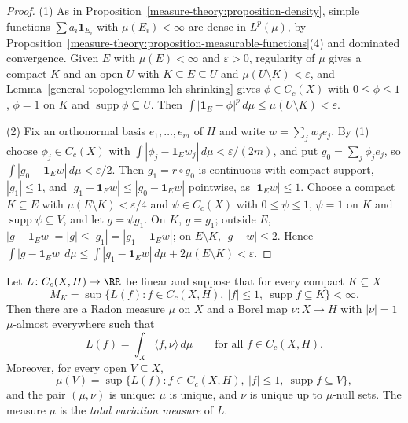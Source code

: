 \begin{proof}
(1) As in Proposition~\ref{measure-theory:proposition-density}, simple functions $\sum a_i\mathbf{1}_{E_i}$ with $\mu(E_i) < \infty$ are dense in $L^p(\mu)$, by
Proposition~\ref{measure-theory:proposition-measurable-functions}(4) and dominated convergence. Given $E$ with $\mu(E) < \infty$ and $\varepsilon > 0$, regularity of $\mu$ gives a compact $K$ and an
open $U$ with $K \subseteq E \subseteq U$ and $\mu(U \setminus K) < \varepsilon$, and Lemma~\ref{general-topology:lemma-lch-shrinking} gives $\phi \in C_c(X)$ with $0 \leq \phi \leq 1$, $\phi = 1$ on $K$ and
$\operatorname{supp}\phi \subseteq U$. Then $\int|\mathbf{1}_E - \phi|^p\,d\mu \leq \mu(U \setminus K) < \varepsilon$.

(2) Fix an orthonormal basis $e_1, \ldots, e_m$ of $H$ and write $w = \sum_jw_je_j$. By (1) choose $\phi_j \in C_c(X)$ with $\int|\phi_j - \mathbf{1}_Ew_j|\,d\mu < \varepsilon/(2m)$, and put
$g_0 = \sum_j\phi_je_j$, so $\int|g_0 - \mathbf{1}_Ew|\,d\mu < \varepsilon/2$. Then $g_1 = r \circ g_0$ is continuous with compact support, $|g_1| \leq 1$, and $|g_1 - \mathbf{1}_Ew| \leq |g_0 - \mathbf{1}_Ew|$
pointwise, as $|\mathbf{1}_Ew| \leq 1$. Choose a compact $K \subseteq E$ with $\mu(E \setminus K) < \varepsilon/4$ and $\psi \in C_c(X)$ with $0 \leq \psi \leq 1$, $\psi = 1$ on $K$ and
$\operatorname{supp}\psi \subseteq V$, and let $g = \psi g_1$. On $K$, $g = g_1$; outside $E$, $|g - \mathbf{1}_Ew| = |g| \leq |g_1| = |g_1 - \mathbf{1}_Ew|$; on $E \setminus K$, $|g - w| \leq 2$. Hence
$\int|g - \mathbf{1}_Ew|\,d\mu \leq \int|g_1 - \mathbf{1}_Ew|\,d\mu + 2\mu(E \setminus K) < \varepsilon$.
\end{proof}

\begin{theorem}\label{radon-measures:theorem-riesz-vector}
Let $L \colon C_c(X, H) \to \RR$ be linear and suppose that for every compact $K \subseteq X$
\[
M_K = \sup\bigl\{L(f) : f \in C_c(X, H),\ |f| \leq 1,\ \operatorname{supp}f \subseteq K\bigr\} < \infty .
\]
Then there are a Radon measure $\mu$ on $X$ and a Borel map $\nu \colon X \to H$ with $|\nu| = 1$ $\mu$-almost everywhere such that
\[
L(f) = \int_X\langle f, \nu\rangle\,d\mu \qquad\text{for all } f \in C_c(X, H).
\]
Moreover, for every open $V \subseteq X$,
\begin{equation}\label{radon-measures:equation-total-variation}
\mu(V) = \sup\bigl\{L(f) : f \in C_c(X, H),\ |f| \leq 1,\ \operatorname{supp}f \subseteq V\bigr\},
\end{equation}
and the pair $(\mu, \nu)$ is unique: $\mu$ is unique, and $\nu$ is unique up to $\mu$-null sets. The measure $\mu$ is the \emph{total variation measure} of $L$.
\end{theorem}

